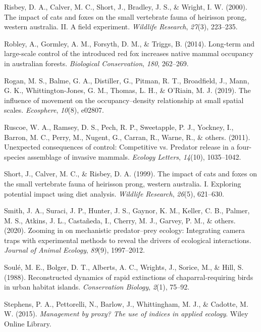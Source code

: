 \documentclass[]{elsarticle} %
\begin{document}
\leavevmode\hypertarget{ref-risbey2000}{}%
Risbey, D. A., Calver, M. C., Short, J., Bradley, J. S., \& Wright, I. W. (2000). The impact of cats and foxes on the small vertebrate fauna of heirisson prong, western australia. II. A field experiment. \emph{Wildlife Research}, \emph{27}(3), 223--235.

\leavevmode\hypertarget{ref-robley2014}{}%
Robley, A., Gormley, A. M., Forsyth, D. M., \& Triggs, B. (2014). Long-term and large-scale control of the introduced red fox increases native mammal occupancy in australian forests. \emph{Biological Conservation}, \emph{180}, 262--269.

\leavevmode\hypertarget{ref-rogan2019}{}%
Rogan, M. S., Balme, G. A., Distiller, G., Pitman, R. T., Broadfield, J., Mann, G. K., Whittington-Jones, G. M., Thomas, L. H., \& O'Riain, M. J. (2019). The influence of movement on the occupancy--density relationship at small spatial scales. \emph{Ecosphere}, \emph{10}(8), e02807.

\leavevmode\hypertarget{ref-ruscoe2011}{}%
Ruscoe, W. A., Ramsey, D. S., Pech, R. P., Sweetapple, P. J., Yockney, I., Barron, M. C., Perry, M., Nugent, G., Carran, R., Warne, R., \& others. (2011). Unexpected consequences of control: Competitive vs. Predator release in a four-species assemblage of invasive mammals. \emph{Ecology Letters}, \emph{14}(10), 1035--1042.

\leavevmode\hypertarget{ref-short1999}{}%
Short, J., Calver, M. C., \& Risbey, D. A. (1999). The impact of cats and foxes on the small vertebrate fauna of heirisson prong, western australia. I. Exploring potential impact using diet analysis. \emph{Wildlife Research}, \emph{26}(5), 621--630.

\leavevmode\hypertarget{ref-smith2020}{}%
Smith, J. A., Suraci, J. P., Hunter, J. S., Gaynor, K. M., Keller, C. B., Palmer, M. S., Atkins, J. L., Castañeda, I., Cherry, M. J., Garvey, P. M., \& others. (2020). Zooming in on mechanistic predator--prey ecology: Integrating camera traps with experimental methods to reveal the drivers of ecological interactions. \emph{Journal of Animal Ecology}, \emph{89}(9), 1997--2012.

\leavevmode\hypertarget{ref-soule1988}{}%
Soulé, M. E., Bolger, D. T., Alberts, A. C., Wrights, J., Sorice, M., \& Hill, S. (1988). Reconstructed dynamics of rapid extinctions of chaparral-requiring birds in urban habitat islands. \emph{Conservation Biology}, \emph{2}(1), 75--92.

\leavevmode\hypertarget{ref-stephens2015}{}%
Stephens, P. A., Pettorelli, N., Barlow, J., Whittingham, M. J., \& Cadotte, M. W. (2015). \emph{Management by proxy? The use of indices in applied ecology}. Wiley Online Library.
\end{document}
